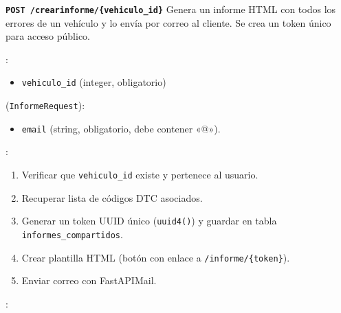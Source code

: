 \documentclass[a4paper,11pt,spanish]{sphinxmanual}
\newcommand{\robotoMonoBold}{\fontseries{b}\selectfont\ttfamily}
\renewcommand{\sphinxcode}[1]{\textcolor{sphinxorangeCode}{{\robotoMonoBold #1}}}
\renewcommand{\sphinxbfcode}[1]{\textbf{\sphinxcode{#1}}}
\renewcommand{\sphinxupquote}[1]{\texttt{#1}}
\begin{document}
\begin{fulllineitems}
\label{\detokenize{endpoints:post--crear-informe-vehiculo_id}}
\pysigstartsignatures
\pysigline
{\sphinxbfcode{\sphinxupquote{POST~}}\sphinxbfcode{\sphinxupquote{/crear\sphinxhyphen{}informe/\{vehiculo\_id\}}}}
\pysigstopsignatures
\sphinxAtStartPar
Genera un informe HTML con todos los errores de un vehículo y lo envía por correo al cliente.
Se crea un token único para acceso público.

\sphinxAtStartPar
{}:
\begin{itemize}
\item {} 
\sphinxAtStartPar
\sphinxcode{\sphinxupquote{vehiculo\_id}} (integer, obligatorio)

\end{itemize}

\sphinxAtStartPar
{} (\sphinxcode{\sphinxupquote{InformeRequest}}):
\begin{itemize}
\item {} 
\sphinxAtStartPar
\sphinxcode{\sphinxupquote{email}} (string, obligatorio, debe contener «@»).

\end{itemize}

\sphinxAtStartPar
{}:
\begin{enumerate}
%
\item {} 
\sphinxAtStartPar
Verificar que \sphinxcode{\sphinxupquote{vehiculo\_id}} existe y pertenece al usuario.

\item {} 
\sphinxAtStartPar
Recuperar lista de códigos DTC asociados.

\item {} 
\sphinxAtStartPar
Generar un token UUID único (\sphinxcode{\sphinxupquote{uuid4()}}) y guardar en tabla \sphinxcode{\sphinxupquote{informes\_compartidos}}.

\item {} 
\sphinxAtStartPar
Crear plantilla HTML (botón con enlace a \sphinxcode{\sphinxupquote{/informe/\{token\}}}).

\item {} 
\sphinxAtStartPar
Enviar correo con FastAPI\sphinxhyphen{}Mail.

\end{enumerate}

\sphinxAtStartPar
{}:


\end{fulllineitems}
\end{document}
